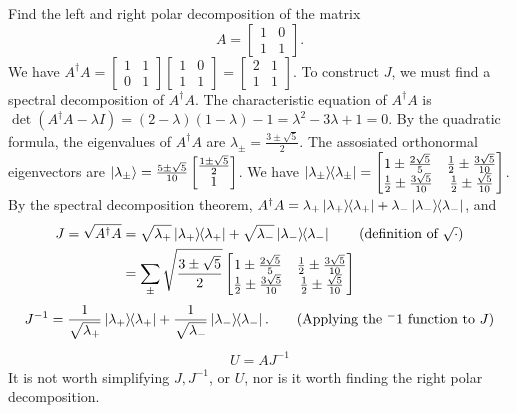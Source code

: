  Find the left and right polar decomposition of the matrix $$A=\begin{bmatrix}1& 0\\ 1&1\end{bmatrix}.$$
\Soln We have
$A^\dagger A = \begin{bmatrix}1& 1\\ 0&1\end{bmatrix}\begin{bmatrix}1& 0\\ 1&1\end{bmatrix} = \begin{bmatrix}
2 & 1 \\
1 & 1
\end{bmatrix}$.  To construct $J$, we must find a spectral decomposition of $A^\dagger A$.  The characteristic equation of $A^\dagger A$ is $\det(A^\dagger A - \lambda I) = (2-\lambda)(1-\lambda)-1 = \lambda^2 - 3 \lambda + 1 = 0$.  By the quadratic formula, the eigenvalues of $A^\dagger A$ are $\lambda_\pm = \frac{3 \pm \sqrt{5}}{2}$.  The assosiated orthonormal eigenvectors are $\ket{\lambda_\pm} =
 \frac{5 \pm\sqrt{5}}{10}  \begin{bmatrix} \frac{1\pm\sqrt{5}}{2} \\
 1
 \end{bmatrix} $.  We have $\ket{\lambda_\pm}\hspace{-1mm} \bra{\lambda_\pm}=\begin{bmatrix}1\pm\frac{2\sqrt{5}}{5} & \frac{1}{2}\pm\frac{3\sqrt{5}}{10} \\ \frac{1}{2}\pm\frac{3\sqrt{5}}{10}  & \frac{1}{2}\pm\frac{\sqrt{5}}{10}\end{bmatrix}$.  By the spectral decomposition theorem, $A^\dagger A = \lambda_+ \ket{\lambda_+}\hspace{-1mm} \bra{\lambda_+} + \lambda_- \ket{\lambda_-}\hspace{-1mm} \bra{\lambda_-}$, and
 \begin{align*}
 	J = \sqrt{A^\dagger A} &= \sqrt{\lambda_+} \kb{\lambda_+} + \sqrt{\lambda_-} \kb{\lambda_-} \tag{definition of $\sqrt{\cdot}$}\\
 		&= \sum_\pm \sqrt{\frac{3 \pm \sqrt{5}}{2}} \begin{bmatrix}1\pm\frac{2\sqrt{5}}{5} & \frac{1}{2}\pm\frac{3\sqrt{5}}{10} \\ \frac{1}{2}\pm\frac{3\sqrt{5}}{10}  & \frac{1}{2}\pm\frac{\sqrt{5}}{10}\end{bmatrix}
 \end{align*}
\begin{align*}
	J^{-1} = \frac{1}{ \sqrt{\lambda_+} } \ket{\lambda_+}\hspace{-1mm} \bra{\lambda_+} + \frac{1}{ \sqrt{\lambda_-} } \ket{\lambda_-}\hspace{-1mm} \bra{\lambda_-}.\tag{Applying the $^-1$ function to $J$}
\end{align*}
\begin{align*}
	U = AJ^{-1} \tag{$A$ is invertible, $U$ is unique}
\end{align*}
It is not worth simplifying $J, J^{-1}$, or $U$, nor is it worth finding the right polar decomposition.

